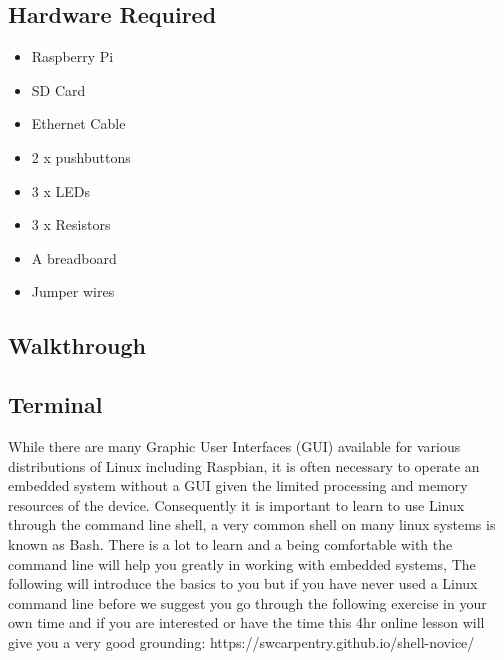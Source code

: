 \subsection{Hardware Required}
\begin{itemize}
    \item Raspberry Pi
    \item SD Card
    \item Ethernet Cable
    \item 2 x pushbuttons
    \item 3 x LEDs
    \item 3 x Resistors
    \item A breadboard
    \item Jumper wires
\end{itemize}

\subsection{Walkthrough}
\subsection{Terminal}
\label{sec:Prac1:Terminal}
While there are many Graphic User Interfaces (GUI) available for various distributions of Linux including Raspbian, it is often necessary to operate an embedded system without a GUI given the limited processing and memory resources of the device.  Consequently it is important to learn to use Linux through the command line shell, a very common shell on many linux systems is known as Bash.  There is a lot to learn and a being comfortable with the command line will help you greatly in working with embedded systems,  The following will introduce the basics to you but if you have never used a Linux command line before we suggest you go through the following exercise in your own time  and if you are interested or have the time this 4hr online lesson will give you a very good grounding: https://swcarpentry.github.io/shell-novice/

